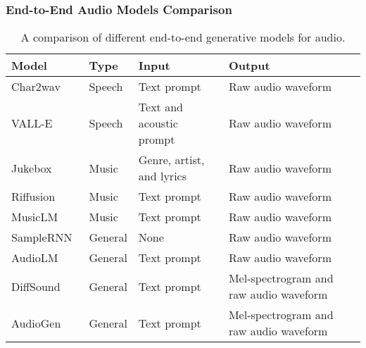 \begin{frame}
    \frametitle{End-to-End Audio Models Comparison}

    \begin{table}[ht]
        \centering
        \caption{A comparison of different end-to-end generative models for audio.}
        \begin{tabularx}{\textwidth}{|X|l|X|X|}
            \hline
            \textbf{Model}                           & \textbf{Type} & \textbf{Input}            & \textbf{Output}                        \\ \hline
            Char2wav~\cite{sotelo_char2wav_2017}     & Speech        & Text prompt               & Raw audio waveform                     \\ \hline
            VALL-E~\cite{wang_neural_2023}           & Speech        & Text and acoustic prompt  & Raw audio waveform                     \\ \hline
            Jukebox~\cite{dhariwal_jukebox_2020}     & Music         & Genre, artist, and lyrics & Raw audio waveform                     \\ \hline
            Riffusion~\cite{forsgren_riffusion_2022} & Music         & Text prompt               & Raw audio waveform                     \\ \hline
            MusicLM~\cite{agostinelli_musiclm_2023}  & Music         & Text prompt               & Raw audio waveform                     \\ \hline
            SampleRNN~\cite{mehri_samplernn_2017}    & General       & None                      & Raw audio waveform                     \\ \hline
            AudioLM~\cite{borsos_audiolm_2022}       & General       & Text prompt               & Raw audio waveform                     \\ \hline
            DiffSound~\cite{yang_diffsound_2022}     & General       & Text prompt               & Mel-spectrogram and raw audio waveform \\ \hline
            AudioGen~\cite{kreuk_audiogen_2023}      & General       & Text prompt               & Mel-spectrogram and raw audio waveform \\ \hline
        \end{tabularx}
        \label{tab:end-to-end-audio-models}
    \end{table}
\end{frame}

